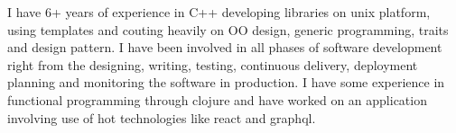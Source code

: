 

\begin{cvparagraph}

 I have 6+ years of experience in C++ developing libraries on unix platform, using templates and couting heavily on OO design, generic programming, traits and design pattern.
 I have been involved in all phases of software development right from the designing, writing, testing, continuous delivery, deployment planning and monitoring the software in production.
 I have some experience in functional programming through clojure and have worked on an application involving use of hot technologies like react and graphql.
\end{cvparagraph}
